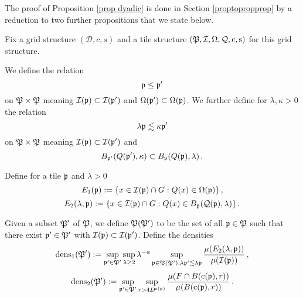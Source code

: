 






The proof of Proposition \ref{prop dyadic} is done in Section \ref{proptopropprop}
by a reduction to two further propositions that we state below.


Fix a grid structure  $(\mathcal{D}, c, s)$  and a tile structure $(\mathfrak P,\mathcal{I},\Omega,\mathcal{Q},\mathrm{c},\mathrm{s})$
for this grid structure.

We define the relation
\begin{equation}\label{straightorder}
    \mathfrak p\le \mathfrak p'
\end{equation}
 on $\mathfrak P\times \mathfrak P$ meaning
$\mathcal{I}(\mathfrak p)\subset \mathcal{I}(\mathfrak p')$ and
$\Omega(\mathfrak p')\subset \Omega(\mathfrak p)$.
We further define for $\lambda,\kappa>0$
the relation
\begin{equation}\label{wiggleorder}
    \lambda \mathfrak p \lesssim \kappa\mathfrak p'
\end{equation}
on $\mathfrak P\times \mathfrak P$ meaning
$\mathcal{I}(\mathfrak p)\subset \mathcal{I}(\mathfrak p')$ and
\begin{equation}
    B_{\mathfrak p'}(Q(\mathfrak p'),\kappa )
    \subset B_{\mathfrak p}(Q(\mathfrak p),\lambda )\, .
\end{equation}



Define for a tile $\mathfrak p$ and $\lambda>0$
\begin{equation}\label{definee1}
    E_1(\mathfrak p):=\{x\in \mathcal{I}(\mathfrak p)\cap G: {Q}(x)\in \Omega(\mathfrak p)\}\, ,
\end{equation}
\begin{equation}\label{definee2}
    E_2(\lambda, \mathfrak p):=\{x\in \mathcal{I}(\mathfrak p)\cap G: {Q}(x)\in B_{\mathfrak p}(\mathcal{Q}(\mathfrak p), \lambda)\}\, .
\end{equation}



Given a subset $\mathfrak P'$ of $\mathfrak P$, we define
$\mathfrak P(\mathfrak P')$ to be the set of
all $\mathfrak p \in \mathfrak P$ such that there exist $\mathfrak p' \in \mathfrak P'$ with $\mathcal{I}(\mathfrak p)\subset \mathcal{I}(\mathfrak p')$. Define  the densities
\begin{equation}\label{definedens1}
    {\operatorname{\operatorname{dens}}}_1(\mathfrak P') := \sup_{\mathfrak p'\in \mathfrak P'}\sup_{\lambda \geq 2} \lambda^{-a} \sup_{\mathfrak p \in \mathfrak P(\mathfrak P'), \lambda \mathfrak p' \lesssim \lambda \mathfrak p}
    \frac{\mu({E}_2(\lambda, \mathfrak p))}{\mu(\mathcal{I}(\mathfrak p))}\, ,
\end{equation}
\begin{equation}\label{definedens2}
    {\operatorname{\operatorname{dens}}}_2(\mathfrak P') := \sup_{\mathfrak p'\in \mathfrak P'}
    \sup_{r>4D^{\mathrm{s}(\mathfrak p)}}
    \frac{\mu(F\cap B(\mathrm{c}(\mathfrak p),r))}{\mu(B(\mathrm{c}(\mathfrak p),r))}\, .
\end{equation}





